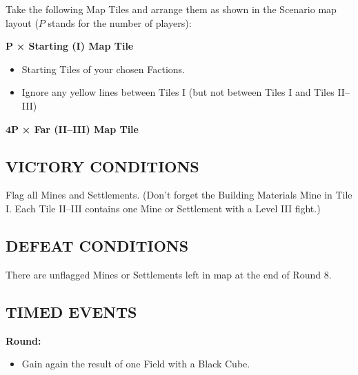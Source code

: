 \begin{multicols*}{2}
Take the following Map Tiles and arrange them as shown in the Scenario map layout ($P$ stands for the number of players):

$\boldsymbol{P}$ \textbf{× Starting (I) Map Tile}
\begin{itemize}
  \item Starting Tiles of your chosen Factions.
  \item Ignore any yellow lines between Tiles I (but not between Tiles I and Tiles II--III)
\end{itemize}

$\boldsymbol{4 P}$ \textbf{× Far (II--III) Map Tile}

\subsection*{\MakeUppercase{Victory Conditions}}

Flag all Mines and Settlements. (Don't forget the Building Materials Mine in Tile I. Each Tile II--III contains one Mine or Settlement with a Level III fight.)

\subsection*{\MakeUppercase{Defeat Conditions}}

There are unflagged Mines or Settlements left in map at the end of Round 8.

\subsection*{\MakeUppercase{Timed Events}}

\textbf{ Round:}
\begin{itemize}
  \item Gain again the result of one Field with a Black Cube.
\end{itemize}


\end{multicols*}
